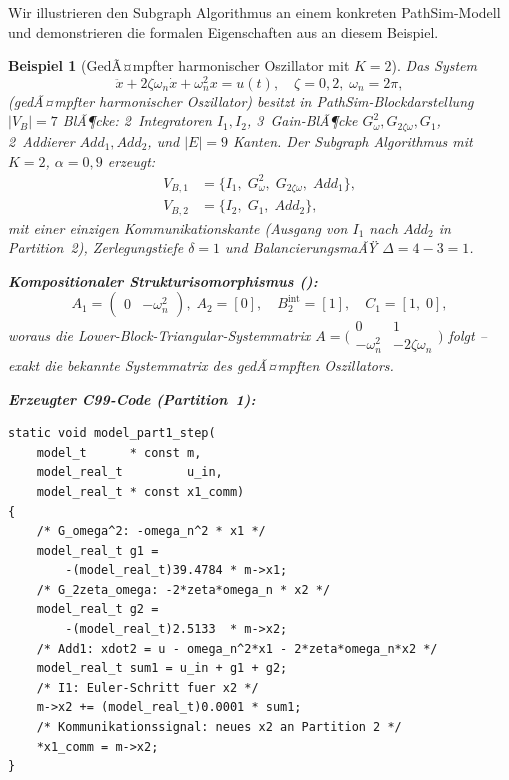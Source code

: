 ﻿\documentclass[12pt,a4paper]{article}
\newtheorem{beispiel}[theorem]{Beispiel}
\theoremstyle{definition}
\begin{document}
Wir illustrieren den Subgraph Algorithmus an einem konkreten PathSim-Modell
und demonstrieren die formalen Eigenschaften aus 
an diesem Beispiel.

\begin{beispiel}[GedÃ¤mpfter harmonischer Oszillator mit $K = 2$]
\label{ex:oscillator}
Das System
\[
  \ddot{x} + 2\zeta\omega_n \dot{x} + \omega_n^2 x = u(t),
  \quad \zeta = 0{,}2,\; \omega_n = 2\pi,
\]
(gedÃ¤mpfter harmonischer Oszillator) besitzt in PathSim-Blockdarstellung
$|V_B| = 7$ BlÃ¶cke: 2~Integratoren $I_1, I_2$, 3~Gain-BlÃ¶cke
$G_\omega^2, G_{2\zeta\omega}, G_1$, 2~Addierer $\mathit{Add}_1, \mathit{Add}_2$,
und $|E| = 9$ Kanten. Der Subgraph Algorithmus mit $K=2$, $\alpha = 0{,}9$
erzeugt:
\begin{align*}
  V_{B,1} &= \{I_1,\; G_\omega^2,\; G_{2\zeta\omega},\; \mathit{Add}_1\}, \\
  V_{B,2} &= \{I_2,\; G_1,\; \mathit{Add}_2\},
\end{align*}
mit einer einzigen Kommunikationskante (Ausgang von $I_1$ nach
$\mathit{Add}_2$ in Partition~2), Zerlegungstiefe $\delta = 1$
und BalancierungsmaÃŸ $\Delta = 4 - 3 = 1$.

\textbf{Kompositionaler Strukturisomorphismus ():}
\[
  A_1 = \begin{pmatrix} 0 & -\omega_n^2 \end{pmatrix},\;
  A_2 = [0],\quad
  B_2^{\mathrm{int}} = [1],\quad
  C_1 = [1,\;0],
\]
woraus die Lower-Block-Triangular-Systemmatrix
$A = \bigl(\begin{smallmatrix}0 & 1 \\ -\omega_n^2 & -2\zeta\omega_n
\end{smallmatrix}\bigr)$ folgt -- exakt die bekannte Systemmatrix des
gedÃ¤mpften Oszillators.

\textbf{Erzeugter C99-Code (Partition~1):}
\begin{lstlisting}[style=cstyle, caption={Subgraph Algorithmus -- Partie 1: Zustandsableitung}]
static void model_part1_step(
    model_t      * const m,
    model_real_t         u_in,
    model_real_t * const x1_comm)
{
    /* G_omega^2: -omega_n^2 * x1 */
    model_real_t g1 =
        -(model_real_t)39.4784 * m->x1;
    /* G_2zeta_omega: -2*zeta*omega_n * x2 */
    model_real_t g2 =
        -(model_real_t)2.5133  * m->x2;
    /* Add1: xdot2 = u - omega_n^2*x1 - 2*zeta*omega_n*x2 */
    model_real_t sum1 = u_in + g1 + g2;
    /* I1: Euler-Schritt fuer x2 */
    m->x2 += (model_real_t)0.0001 * sum1;
    /* Kommunikationssignal: neues x2 an Partition 2 */
    *x1_comm = m->x2;
}
\end{lstlisting}


\end{beispiel}
\end{document}
